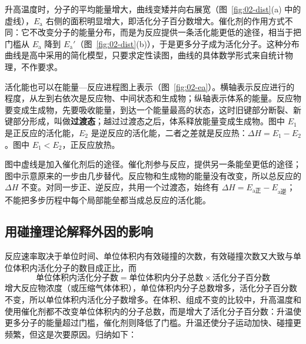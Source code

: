 升高温度时，分子的平均能量增大，曲线变矮并向右展宽（图~\ref{fig:02-dist}(a) 中的虚线），$E_\text{a}$ 右侧的面积明显增大，即活化分子百分数增大。催化剂的作用方式不同：它不改变分子的能量分布，而是为反应提供一条活化能更低的途径，相当于把门槛从 $E_\text{a}$ 降到 $E_\text{a}'$（图~\ref{fig:02-dist}(b)），于是更多分子成为活化分子。这种分布曲线是高中采用的简化模型，只要求定性读图，曲线的具体数学形式来自统计物理，不作要求。

活化能也可以在能量—反应进程图上表示（图~\ref{fig:02-ea}）。横轴表示反应进行的程度，从左到右依次是反应物、中间状态和生成物；纵轴表示体系的能量。反应物要变成生成物，先要吸收能量，到达一个能量最高的状态，这时旧键部分断裂、新键部分形成，叫做\textbf{过渡态}；越过过渡态之后，体系释放能量变成生成物。图中 $E_1$ 是正反应的活化能，$E_2$ 是逆反应的活化能，二者之差就是反应热：$\Delta H=E_1-E_2$。图中 $E_1<E_2$，正反应放热。


图中虚线是加入催化剂后的途径。催化剂参与反应，提供另一条能垒更低的途径；图中示意原来的一步由几步替代。反应物和生成物的能量没有改变，所以总反应的 $\Delta H$ 不变。对同一步正、逆反应，共用一个过渡态，始终有 $\Delta H=E_{\text{a正}}-E_{\text{a逆}}$；不能把多步历程中每个局部能垒都当成总反应的活化能。

\subsection{用碰撞理论解释外因的影响}
反应速率取决于单位时间、单位体积内有效碰撞的次数，有效碰撞次数又大致与单位体积内活化分子的数目成正比，而
\[\text{单位体积内活化分子数}=\text{单位体积内分子总数}\times\text{活化分子百分数}\]
增大反应物浓度（或压缩气体体积），单位体积内分子总数增多，活化分子百分数不变，所以单位体积内活化分子数增多。在体积、组成不变的比较中，升高温度和使用催化剂都不改变单位体积内的分子总数，而是增大了活化分子百分数：升温使更多分子的能量超过门槛，催化剂则降低了门槛。升温还使分子运动加快、碰撞更频繁，但这是次要原因。归纳如下：


